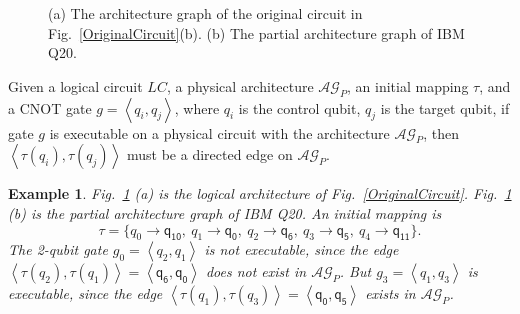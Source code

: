 \documentclass[journal]{IEEEtran}
\newtheorem{example}{Example}
\begin{document}
\begin{figure}
\begin{center}
{
			}
\end{center}
	
	\caption{(a) The architecture graph of the original circuit in Fig.~\ref{OriginalCircuit}(b). (b) The partial architecture graph of IBM Q20.}
	\label{LAGPAG}
\end{figure}
	

Given a logical circuit $LC$, a physical architecture $\mathcal{AG}_{P}$, an initial mapping $\tau$, and a CNOT gate $g=\left \langle \textit{q}_\textit{i},\textit{q}_\textit{j}\right \rangle $, where $\textit{q}_\textit{i}$ is the control qubit, $\textit{q}_\textit{j}$ is the target qubit,
if gate $g$ is executable on a physical circuit with the architecture $\mathcal{AG}_{P}$, then
$\left \langle\tau(\textit{q}_\textit{i}),\tau(\textit{q}_\textit{j})\right \rangle $ 
must be a directed edge on $\mathcal{AG}_{P}$.


\begin{example}
	Fig.~\ref{LAGPAG} (a) is the logical architecture of Fig.~\ref{OriginalCircuit}. 
	Fig.~\ref{LAGPAG} (b) is the partial architecture graph of IBM Q20. An initial mapping is 
	$$\tau=\{\textit{q}_\textit{0}\rightarrow  \textsf{q}_{\textsf{10}},\ \textit{q}_\textit{1}\rightarrow \textsf{q}_{\textsf{0}},\ 
	\textit{q}_\textit{2}\rightarrow  \textsf{q}_{\textsf{6}},\ \textit{q}_\textit{3}\rightarrow  \textsf{q}_{\textsf{5}},\ \textit{q}_\textit{4}\rightarrow  \textsf{q}_{\textsf{11}}\} .$$
The 2-qubit gate	$g_{0}=\left \langle \textit{q}_\textit{2},\textit{q}_\textit{1}\right \rangle $ is not executable, since the edge $\left \langle \tau(\textit{q}_\textit{2}),\tau(\textit{q}_\textit{1})\right \rangle =\left \langle \textsf{q}_{\textsf{6}},\textsf{q}_{\textsf{0}}\right \rangle $ does not exist in $\mathcal{AG}_{P}$.
	But $g_{3}=\left \langle \textit{q}_\textit{1},\textit{q}_\textit{3}\right \rangle $ is executable, since 
	the edge $\left \langle \tau(\textit{q}_\textit{1}),\tau(\textit{q}_\textit{3})\right \rangle =\left \langle \textsf{q}_{\textsf{0}},\textsf{q}_{\textsf{5}}\right \rangle $  exists in $\mathcal{AG}_{P}$.
\end{example}
\end{document}

